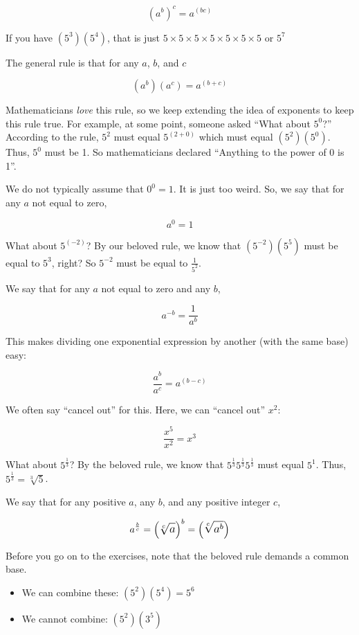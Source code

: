 $$\left(a^b\right)^c = a^{(bc)}$$

If you have $\left( 5^3 \right) \left(5^4 \right)$, that is just $5 \times 5 \times 5 \times 5 \times 5 \times 5 \times 5$ or $5^7$

The general rule is that for any $a$, $b$, and $c$

$$\left(a^b\right)\left(a^c\right) = a^{(b + c)}$$

Mathematicians \textit{love} this rule, so we keep extending the idea
of exponents to keep this rule true. For example, at some point,
someone asked ``What about $5^0$?'' According to the rule, $5^{2}$
must equal $5^{(2 + 0)}$ which must equal
$\left(5^2\right)\left(5^0\right)$.  Thus, $5^0$ must be 1. So
mathematicians declared ``Anything to the power of 0 is 1''.

We do not typically assume that $0^0 = 1$. It is just too
weird. So, we say that for any $a$ not equal to zero,

$$a^0 = 1$$

What about $5^{(-2)}$?  By our beloved rule, we know that
$\left(5^{-2}\right)\left(5^5\right)$ must be equal to $5^3$, right?
So $5^{-2}$ must be equal to $\frac{1}{5^2}$.

We say that for any $a$ not equal to zero and any $b$,

$$a^{-b} = \frac{1}{a^{b}}$$

This makes dividing one exponential expression by another (with the same base) easy:

$$\frac{a^b}{a^c} = a^{(b-c)}$$

We often say ``cancel out'' for this. Here, we can ``cancel out'' $x^2$:

$$\frac{x^5}{x^2} = x^3$$

What about $5^{\frac{1}{3}}$? By the beloved rule, we know that $5^{\frac{1}{3}}5^{\frac{1}{3}}5^{\frac{1}{3}}$ must equal $5^1$. Thus, $5^{\frac{1}{3}} = \sqrt[3]{5}$.

We say that for any positive $a$, any $b$, and any positive integer $c$,

\[
\large {a^{\frac{b}{c}}} = \left(\sqrt[c]{a}\right)^{b}=\left(\sqrt[c]{a^b}\right)
\]

Before you go on to the exercises, note that the beloved rule demands a common base.
\begin{itemize}
\item We can combine these: $\left(5^2\right)\left(5^4\right) = 5^6$
\item We cannot combine: $\left(5^2\right)\left(3^5\right)$
\end{itemize}

